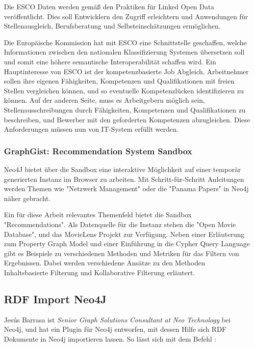 Die ESCO Daten werden gemäß den Praktiken für Linked Open Data veröffentlicht. Dies soll Entwicklern den Zugriff erleichtern und Anwendungen für Stellenausgleich, Berufsberatung und Selbsteinschätzungen ermöglichen.

Die Europäische Kommission hat mit ESCO eine Schnittstelle geschaffen, welche Informationen zwischen den nationalen Klassifizierung Systemen übersetzen soll und somit eine höhere semantische Interoperabilität schaffen wird. Ein Hauptinteresse von ESCO ist der kompetenzbasierte Job Abgleich. Arbeitnehmer sollen ihre eigenen Fähigkeiten, Kompetenzen und Qualifikationen mit freien Stellen vergleichen können, und so eventuelle Kompetenzlücken identifizieren zu können. Auf der anderen Seite, muss es Arbeitgebern möglich sein, Stellenausschreibungen durch  Fähigkeiten, Kompetenzen und Qualifikationen zu beschreiben, und Bewerber mit den geforderten Kompetenzen abzugleichen. Diese Anforderungen müssen nun von IT-System erfüllt werden. 


\subsubsection{GraphGist: Recommendation System Sandbox}\label{recommender}

Neo4J bietet über die Sandbox eine interaktive Möglichkeit auf einer temporär generierten Instanz im Browser zu arbeiten. Mit Schritt-für-Schritt Anleitungen werden Themen wie "Netzwerk Management" oder die "Panama Papers" in Neo4j näher gebracht. 

Ein für diese Arbeit relevantes Themenfeld bietet die Sandbox "Recommendations".\cite{neo4j} Als Datenquelle für die Instanz stehen die "Open Movie Database"\cite{omdb}, und das MovieLens Projekt\cite{grouplens_2016} zur Verfügung.
Neben einer Erläuterung zum Property Graph Model und einer Einführung in die Cypher Query Language gibt es Beispiele zu verschiedenen Methoden und Metriken für das Filtern von Ergebnissen. Dabei werden verschiedene Ansätze zu den Methoden Inhaltsbasierte Filterung und Kollaborative Filterung erläutert. 
\subsection{RDF Import Neo4J}

Jesús Barrasa ist  \textit{Senior Graph Solutions Consultant at Neo Technology} bei Neo4j, und hat ein Plugin für Neo4j entworfen, mit dessen Hilfe sich RDF Dokumente in Neo4j importieren lassen. So lässt sich mit dem Befehl :
\vspace{1em}

